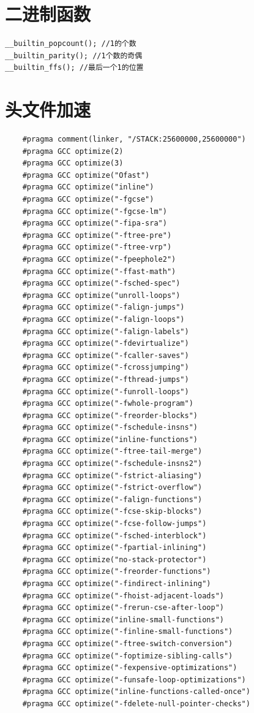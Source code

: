 \documentclass[a4paper,11pt,twoside,fontset = fandol,UTF8]{ctexbook} %
\begin{document}
	\section{二进制函数}
	\begin{lstlisting}
__builtin_popcount(); //1的个数
__builtin_parity(); //1个数的奇偶
__builtin_ffs(); //最后一个1的位置 
	\end{lstlisting}
	
	\section{头文件加速}
	\begin{lstlisting}
	#pragma comment(linker, "/STACK:25600000,25600000")
	#pragma GCC optimize(2)
	#pragma GCC optimize(3)
	#pragma GCC optimize("Ofast")
	#pragma GCC optimize("inline")
	#pragma GCC optimize("-fgcse")
	#pragma GCC optimize("-fgcse-lm")
	#pragma GCC optimize("-fipa-sra")
	#pragma GCC optimize("-ftree-pre")
	#pragma GCC optimize("-ftree-vrp")
	#pragma GCC optimize("-fpeephole2")
	#pragma GCC optimize("-ffast-math")
	#pragma GCC optimize("-fsched-spec")
	#pragma GCC optimize("unroll-loops")
	#pragma GCC optimize("-falign-jumps")
	#pragma GCC optimize("-falign-loops")
	#pragma GCC optimize("-falign-labels")
	#pragma GCC optimize("-fdevirtualize")
	#pragma GCC optimize("-fcaller-saves")
	#pragma GCC optimize("-fcrossjumping")
	#pragma GCC optimize("-fthread-jumps")
	#pragma GCC optimize("-funroll-loops")
	#pragma GCC optimize("-fwhole-program")
	#pragma GCC optimize("-freorder-blocks")
	#pragma GCC optimize("-fschedule-insns")
	#pragma GCC optimize("inline-functions")
	#pragma GCC optimize("-ftree-tail-merge")
	#pragma GCC optimize("-fschedule-insns2")
	#pragma GCC optimize("-fstrict-aliasing")
	#pragma GCC optimize("-fstrict-overflow")
	#pragma GCC optimize("-falign-functions")
	#pragma GCC optimize("-fcse-skip-blocks")
	#pragma GCC optimize("-fcse-follow-jumps")
	#pragma GCC optimize("-fsched-interblock")
	#pragma GCC optimize("-fpartial-inlining")
	#pragma GCC optimize("no-stack-protector")
	#pragma GCC optimize("-freorder-functions")
	#pragma GCC optimize("-findirect-inlining")
	#pragma GCC optimize("-fhoist-adjacent-loads")
	#pragma GCC optimize("-frerun-cse-after-loop")
	#pragma GCC optimize("inline-small-functions")
	#pragma GCC optimize("-finline-small-functions")
	#pragma GCC optimize("-ftree-switch-conversion")
	#pragma GCC optimize("-foptimize-sibling-calls")
	#pragma GCC optimize("-fexpensive-optimizations")
	#pragma GCC optimize("-funsafe-loop-optimizations")
	#pragma GCC optimize("inline-functions-called-once")
	#pragma GCC optimize("-fdelete-null-pointer-checks")
	\end{lstlisting}
	
\end{document}
